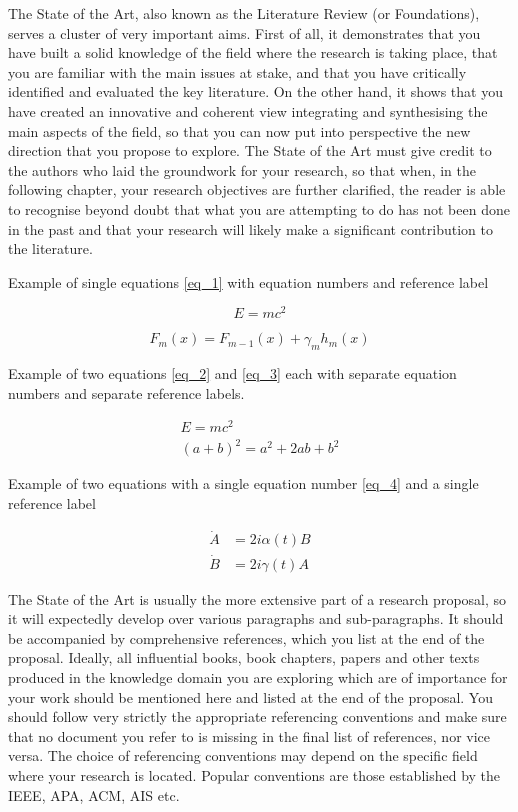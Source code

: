 The State of the Art, also known as the Literature Review (or Foundations), serves a cluster of very important aims. First of all, it demonstrates that you have built a solid knowledge of the field where the research is taking place, that you are familiar with the main issues at stake, and that you have critically identified and evaluated the key
literature. On the other hand, it shows that you have created an innovative and coherent view integrating and synthesising the main aspects of the field, so that you can now put into perspective the new direction that you propose to explore. The State of the Art must give credit to the authors who laid the groundwork for your research, so that when, in the following chapter, your research objectives are further clarified, the reader is able to recognise beyond doubt that what you are attempting to do has not been done in the past and that your research will likely make a significant contribution to the literature.

Example of single equations \eqref{eq_1} with equation numbers and reference label

\begin{equation}
    E=mc^2 \label{eq_1}
\end{equation}

        \begin{equation}
            F_m(x) = F_{m-1}(x) + \gamma_m h_m(x)
        \end{equation}

Example of two equations \eqref{eq_2} and \eqref{eq_3} each with separate equation numbers and separate reference labels.

\begin{gather}
    E=mc^2 \label{eq_2}\\
    (a+b)^2 = a^2 + 2ab + b^2 \label{eq_3}
\end{gather}


Example of two equations with a single equation number \eqref{eq_4} and a single reference label

\begin{equation}
    \begin{aligned}
    \dot{A} &  =2i\alpha(t)B\\
    \dot{B} &  =2i\gamma(t)A
    \end{aligned}
    \label{eq_4}
\end{equation}


The State of the Art is usually the more extensive part of a research proposal, so it will expectedly develop over various paragraphs and sub-paragraphs. It should be accompanied by comprehensive references, which you list at the end of the proposal. Ideally, all influential books, book chapters, papers and other texts produced in the knowledge domain you are exploring which are of importance for your work should be mentioned here and listed at the end of the proposal. You should follow very strictly the appropriate referencing conventions and make sure that no document you refer to is missing in the final list of references, nor vice versa. The choice of referencing conventions may depend on the specific field where your research is located. Popular conventions are those established by the \ac{IEEE}, \ac{APA}, \ac{ACM}, \ac{AIS} etc.


